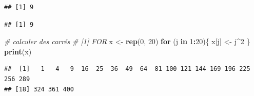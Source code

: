 \documentclass[]{book}
\newenvironment{Shaded}{\begin{snugshade}}{\end{snugshade}}
\newcommand{\CommentTok}[1]{\textcolor[rgb]{0.56,0.35,0.01}{\textit{#1}}}
\newcommand{\ControlFlowTok}[1]{\textcolor[rgb]{0.13,0.29,0.53}{\textbf{#1}}}
\newcommand{\DataTypeTok}[1]{\textcolor[rgb]{0.13,0.29,0.53}{#1}}
\newcommand{\DecValTok}[1]{\textcolor[rgb]{0.00,0.00,0.81}{#1}}
\newcommand{\KeywordTok}[1]{\textcolor[rgb]{0.13,0.29,0.53}{\textbf{#1}}}
\newcommand{\NormalTok}[1]{#1}
\newcommand{\OperatorTok}[1]{\textcolor[rgb]{0.81,0.36,0.00}{\textbf{#1}}}
\newcommand{\StringTok}[1]{\textcolor[rgb]{0.31,0.60,0.02}{#1}}
\begin{document}
\begin{Shaded}
\end{Shaded}

\begin{verbatim}
## [1] 9
\end{verbatim}

\begin{Shaded}
\end{Shaded}

\begin{verbatim}
## [1] 9
\end{verbatim}

\begin{Shaded}
\begin{Highlighting}[]
\CommentTok{# calculer des carrés}
\CommentTok{# [1] FOR}
\NormalTok{x <-}\StringTok{ }\KeywordTok{rep}\NormalTok{(}\DecValTok{0}\NormalTok{, }\DecValTok{20}\NormalTok{)}
\ControlFlowTok{for}\NormalTok{ (j }\ControlFlowTok{in} \DecValTok{1}\OperatorTok{:}\DecValTok{20}\NormalTok{)\{}
\NormalTok{  x[j] <-}\StringTok{ }\NormalTok{j}\OperatorTok{^}\DecValTok{2}
\NormalTok{\}}
\KeywordTok{print}\NormalTok{(x)}
\end{Highlighting}
\end{Shaded}

\begin{verbatim}
##  [1]   1   4   9  16  25  36  49  64  81 100 121 144 169 196 225 256 289
## [18] 324 361 400
\end{verbatim}
\end{document}
